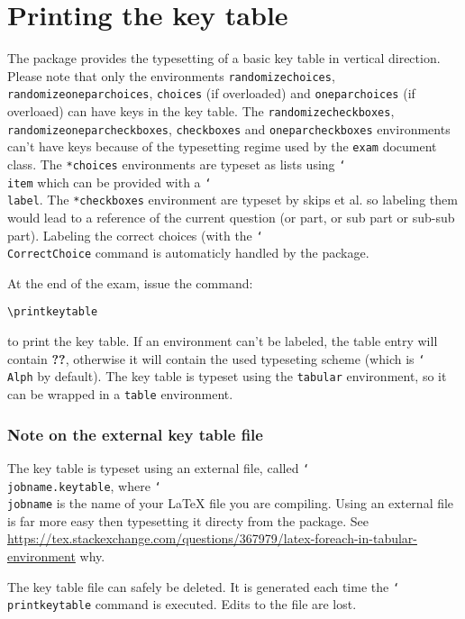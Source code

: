 \documentclass[12pt,a4paper]{exam}
\providecommand{\texorpdfstring}[2]{#1}
\newcommand{\bs}{\texorpdfstring{\char`\\}{}}
\begin{document}
\section{Printing the key table}
The package provides the typesetting of a basic key table in vertical direction.
Please note that only the environments \texttt{randomizechoices},
\texttt{randomizeoneparchoices}, \texttt{choices} (if overloaded) and
\texttt{oneparchoices} (if overloaed) can have keys in the key table.
The \texttt{randomizecheckboxes}, \texttt{randomizeoneparcheckboxes},
\texttt{checkboxes} and \texttt{oneparcheckboxes} environments can't 
have keys because of the typesetting regime used by the \texttt{exam}
document class. The \texttt{*choices} environments are typeset as lists
using \texttt{\bs item} which can be provided with a \texttt{\bs label}.
The \texttt{*checkboxes} environment are typeset by skips et al. so 
labeling them would lead to a reference of the current question (or part,
or sub part or sub-sub part). Labeling the correct choices (with the
\texttt{\bs CorrectChoice} command is automaticly handled by the
package.

At the end of the exam, issue the command:

\begin{lstlisting}
\printkeytable
\end{lstlisting}

to print the key table. If an environment can't be labeled, the table entry
will contain \textbf{??}, otherwise it will contain the used typeseting scheme
(which is \texttt{\bs Alph} by default).
The key table is typeset using the \texttt{tabular}
environment, so it can be wrapped in a \texttt{table} environment.

\subsubsection*{Note on the external key table file}
The key table is typeset using an external file, called \texttt{\bs jobname.keytable},
where \texttt{\bs jobname} is the name of your \LaTeX{} file you are compiling. Using
an external file is far more easy then typesetting it directy from the package. See
\url{https://tex.stackexchange.com/questions/367979/latex-foreach-in-tabular-environment}
why.

The key table file can safely be deleted. It is generated each time the
\texttt{\bs printkeytable} command is executed. Edits to the file are lost.

\printkeytable
\end{document}
